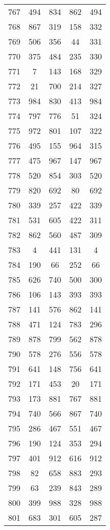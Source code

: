 \documentclass[a4paper,10pt,ngerman]{scrartcl}
\begin{document}
\begin{longtable}[c]{c|c|c|c|c}
    767 & 494 & 834 & 862 & 494 \\
    768 & 867 & 319 & 158 & 332 \\
    769 & 506 & 356 & 44 & 331 \\
    770 & 375 & 484 & 235 & 330 \\
    771 & 7 & 143 & 168 & 329 \\
    772 & 21 & 700 & 214 & 327 \\
    773 & 984 & 830 & 413 & 984 \\
    774 & 797 & 776 & 51 & 324 \\
    775 & 972 & 801 & 107 & 322 \\
    776 & 495 & 155 & 964 & 315 \\
    777 & 475 & 967 & 147 & 967 \\
    778 & 520 & 854 & 303 & 520 \\
    779 & 820 & 692 & 80 & 692 \\
    780 & 339 & 257 & 422 & 339 \\
    781 & 531 & 605 & 422 & 311 \\
    782 & 862 & 560 & 487 & 309 \\
    783 & 4 & 441 & 131 & 4 \\
    784 & 190 & 66 & 252 & 66 \\
    785 & 626 & 740 & 500 & 300 \\
    786 & 106 & 143 & 393 & 393 \\
    787 & 141 & 576 & 862 & 141 \\
    788 & 471 & 124 & 783 & 296 \\
    789 & 878 & 799 & 562 & 878 \\
    790 & 578 & 276 & 556 & 578 \\
    791 & 641 & 148 & 756 & 641 \\
    792 & 171 & 453 & 20 & 171 \\
    793 & 173 & 881 & 767 & 881 \\
    794 & 740 & 566 & 867 & 740 \\
    795 & 286 & 467 & 551 & 467 \\
    796 & 190 & 124 & 353 & 294 \\
    797 & 401 & 912 & 616 & 912 \\
    798 & 82 & 658 & 883 & 293 \\
    799 & 63 & 239 & 843 & 289 \\
    800 & 399 & 988 & 328 & 988 \\
    801 & 683 & 301 & 605 & 287 \\

\end{longtable}
\end{document}
